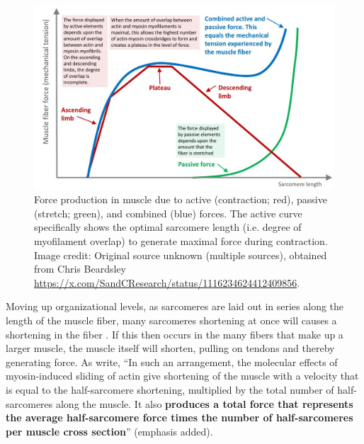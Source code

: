 \documentclass{article}
\begin{document}
\begin{figure}[!htbp]
\centering
\includegraphics[width=0.9\linewidth]{files/EPpXta8zJdzN048lz8AR-1f4604f22b1712e3532278f27c9f6c4c.png}
\caption[]{Force production in muscle due to active (contraction; red), passive (stretch; green), and combined (blue) forces. The active curve specifically shows the optimal sarcomere length (i.e. degree of myofilament overlap) to generate maximal force during contraction. Image credit: Original source unknown (multiple sources), obtained from Chris Beardsley \href{https://x.com/SandCResearch/status/1116234624412409856}{https://x.com/SandCResearch/status/1116234624412409856}.}
\label{MlwkqfVYNC}
\end{figure}

Moving up organizational levels, as sarcomeres are laid out in series along the length of the muscle fiber, many sarcomeres shortening at once will causes a shortening in the fiber \citep{rassier2017sarcomere}. If this then occurs in the many fibers that make up a larger muscle, the muscle itself will shorten, pulling on tendons and thereby generating force. As \citet{Rassier2025Mechanisms} write, ``In such an arrangement, the molecular effects of myosin-induced sliding of actin give shortening of the muscle with a velocity that is equal to the half-sarcomere shortening, multiplied by the total number of half-sarcomeres along the muscle. It also \textbf{produces a total force that represents the average half-sarcomere force times the number of half-sarcomeres per muscle cross section}'' (emphasis added).
\end{document}
